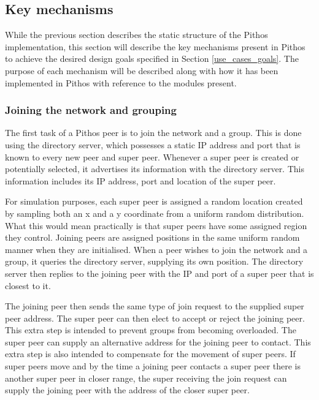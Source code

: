 \subsection{Key mechanisms}
\label{key_mechanisms}


While the previous section describes the static structure of the Pithos implementation, this section will describe the key mechanisms present in Pithos to achieve the desired design goals specified in Section \ref{use_cases_goals}. The purpose of each mechanism will be described along with how it has been implemented in Pithos with reference to the modules present.

    \subsubsection{Joining the network and grouping}
    \label{network_join_implementation}

    The first task of a Pithos peer is to join the network and a group. This is done using the directory server, which possesses a static IP address and port that is known to every new peer and super peer. Whenever a super peer is created or potentially selected, it advertises its information with the directory server. This information includes its IP address, port and location of the super peer.

    For simulation purposes, each super peer is assigned a random location created by sampling both an x and a y coordinate from a uniform random distribution. What this would mean practically is that super peers have some assigned region they control. Joining peers are assigned positions in the same uniform random manner when they are initialised. When a peer wishes to join the network and a group, it queries the directory server, supplying its own position. The directory server then replies to the joining peer with the IP and port of a super peer that is closest to it.

    The joining peer then sends the same type of join request to the supplied super peer address. The super peer can then elect to accept or reject the joining peer. This extra step is intended to prevent groups from becoming overloaded. The super peer can supply an alternative address for the joining peer to contact. This extra step is also intended to compensate for the movement of super peers. If super peers move and by the time a joining peer contacts a super peer there is another super peer in closer range, the super receiving the join request can supply the joining peer with the address of the closer super peer.

